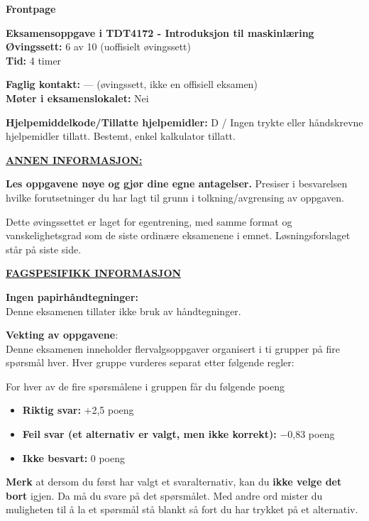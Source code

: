\documentclass[11pt,a4paper]{article}
\begin{document}
\noindent\hspace*{-1.55em}%
{\sffamily\bfseries\fontsize{18}{22}\selectfont Frontpage}\par\vspace{1.1em}

{\bfseries Eksamensoppgave i TDT4172 - Introduksjon til maskinlæring}\\
{\bfseries Øvingssett:} 6 av 10 (uoffisielt øvingssett)\\
{\bfseries Tid:} 4 timer

\vspace{0.6em}
{\bfseries Faglig kontakt:} --- (øvingssett, ikke en offisiell eksamen)\\
{\bfseries Møter i eksamenslokalet:} Nei

\vspace{0.6em}
{\bfseries Hjelpemiddelkode/Tillatte hjelpemidler:} D / Ingen trykte eller håndskrevne hjelpemidler tillatt.
Bestemt, enkel kalkulator tillatt.

\vspace{0.6em}
{\bfseries\underline{ANNEN INFORMASJON:}}

\vspace{0.4em}
{\bfseries Les oppgavene nøye og gjør dine egne antagelser.} Presiser i besvarelsen hvilke forutsetninger du
har lagt til grunn i tolkning/avgrensing av oppgaven.

Dette øvingssettet er laget for egentrening, med samme format og vanskelighetsgrad som de
siste ordinære eksamenene i emnet. Løsningsforslaget står på siste side.

\vspace{1.6em}
{\bfseries\underline{FAGSPESIFIKK INFORMASJON}}

\vspace{0.4em}
{\bfseries Ingen papirhåndtegninger:}\\
Denne eksamenen tillater ikke bruk av håndtegninger.

\vspace{1.4em}
{\bfseries Vekting av oppgavene}:\\
Denne eksamenen inneholder flervalgsoppgaver organisert i ti grupper på fire spørsmål hver. Hver
gruppe vurderes separat etter følgende regler:

\vspace{0.6em}
For hver av de fire spørsmålene i gruppen får du følgende poeng
\begin{itemize}[leftmargin=2.2em,label=\textperiodcentered,itemsep=0pt]
\item {\bfseries Riktig svar:} +2,5 poeng
\item {\bfseries Feil svar (et alternativ er valgt, men ikke korrekt):} $-$0,83 poeng
\item {\bfseries Ikke besvart:} 0 poeng
\end{itemize}
{\bfseries Merk} at dersom du først har valgt et svaralternativ, kan du {\bfseries ikke velge det bort} igjen. Da må du
svare på det spørsmålet. Med andre ord mister du muligheten til å la et spørsmål stå blankt så fort
du har trykket på et alternativ.
\end{document}

